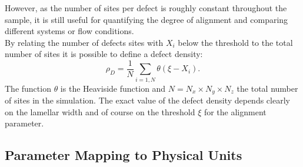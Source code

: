 \documentclass[8.5pt,twoside,twocolumn]{article}
\begin{document}
However, as the number of sites per defect is roughly constant throughout the sample, it is still useful for quantifying the degree of alignment and comparing different systems or flow conditions.\\
By relating the number of defects sites with $X_i$ below the threshold to the total number of sites it is possible to define a defect density:
\begin{equation}\label{defectdensity}
\rho_D=\frac{1}{N} \sum_{i=1,N} \theta(\xi-X_i).  
\end{equation}
The function $\theta$ is the Heaviside function and $N=N_x\times N_y \times N_z$ the total number of sites in the simulation.
The exact value of the defect density depends clearly on the lamellar width and of course on the threshold $\xi$ for the alignment parameter.

\subsection*{Parameter Mapping to Physical Units}
\end{document}
